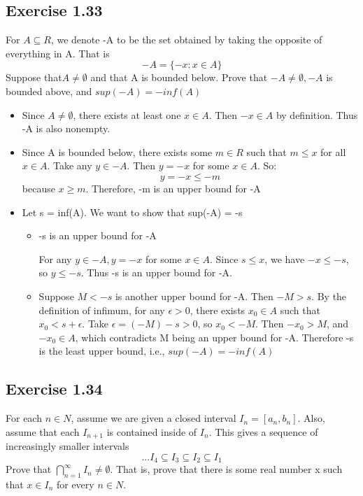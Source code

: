 \documentclass[12pt]{article}
\begin{document}
		\subsection*{Exercise 1.33}
			For $A \subseteq R$, we denote -A to be the set obtained by taking the opposite of everything in A. That is
			\begin{equation}
				-A = \{-x: x \in A\}
			\end{equation}
			Suppose that$ A \ne \emptyset$ and that A is bounded below. Prove that $-A \ne \emptyset, -A$ is bounded above, and $sup(-A) = -inf(A)$
			
			\begin{itemize}
				\item Since $A \ne \emptyset$, there exists at least one $x \in A$. Then $-x \in A$ by definition. Thus -A is also nonempty.
				
				\item Since A is bounded below, there exists some $m \in R$ such that $m \le x$ for all $x \in A$. Take any $y \in -A$. Then $y = -x$ for some $x \in A$. So:
				\begin{equation}
					y = -x \le -m
				\end{equation}
				because $x \ge m$. Therefore, -m is an upper bound for -A
				
				\item Let s = inf(A). We want to show that sup(-A) = -s
					\begin{itemize}
						\item -s is an upper bound for -A
						
						For any $y \in -A, y = -x$ for some $x \in A$. Since $s \le x$, we have $-x \le -s$, so $y \le -s$. Thus -s is an upper bound for -A.
						\item Suppose $M < -s$ is another upper bound for -A. Then $-M > s$. By the definition of infimum, for any $\epsilon > 0$, there exists $x_0 \in A$ such that $x_0 < s + \epsilon$. Take $\epsilon = (-M) - s > 0$, so $x_0 < -M$.
						Then $-x_0 > M$, and $-x_0 \in A$, which contradicts M being an upper bound for -A. Therefore -s is the least upper bound, i.e., $sup(-A) = -inf(A)$
					\end{itemize}
			\end{itemize}
		\subsection*{Exercise 1.34}
			For each $n \in N$, assume we are given a closed interval $I_n = [a_n, b_n]$. Also, assume that each $I_{n+1}$ is contained inside of $I_n$. This gives a sequence of increasingly smaller intervals
			\begin{equation}
				... I_4 \subseteq I_3 \subseteq I_2 \subseteq I_1
			\end{equation}
			Prove that $\bigcap_{n=1}^{\infty}I_n \ne \emptyset$. That is, prove that there is some real number x such that $x \in I_n$ for every $n \in N$.
			
\end{document}
